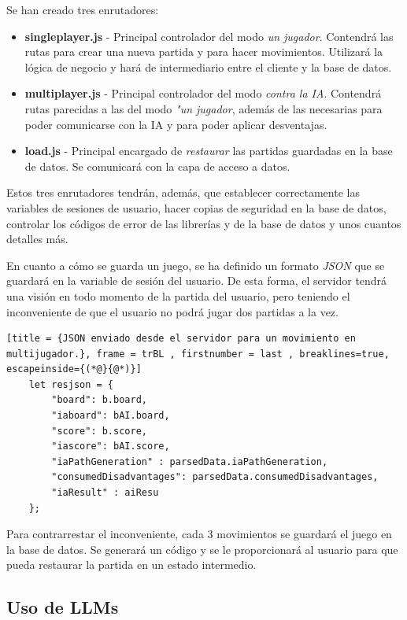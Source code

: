 \documentclass[12pt,epsf,titlepage,a4paper]{article}
\begin{document}
Se han creado tres enrutadores:
\begin{itemize}
    \item \textbf{singleplayer.js} - Principal controlador del modo \emph{un jugador}. Contendrá las rutas para crear una nueva partida y para hacer movimientos. Utilizará la lógica de negocio y hará de intermediario entre el cliente y la base de datos.
    \item \textbf{multiplayer.js} - Principal controlador del modo \emph{contra la IA}. Contendrá rutas parecidas a las del modo \emph{"un jugador}, además de las necesarias para poder comunicarse con la IA y para poder aplicar desventajas.
    \item \textbf{load.js} - Principal encargado de \emph{restaurar} las partidas guardadas en la base de datos. Se comunicará con la capa de acceso a datos.
\end{itemize}

Estos tres enrutadores tendrán, además, que establecer correctamente las variables de sesiones de usuario, hacer copias de seguridad en la base de datos, controlar los códigos de error de las librerías y de la base de datos y unos cuantos detalles más.

En cuanto a cómo se guarda un juego, se ha definido un formato \emph{JSON} que se guardará en la variable de sesión del usuario. De esta forma, el servidor tendrá una visión en todo momento de la partida del usuario, pero teniendo el inconveniente de que el usuario no podrá jugar dos partidas a la vez. 

    \begin{lstlisting}[title = {JSON enviado desde el servidor para un movimiento en multijugador.}, frame = trBL , firstnumber = last , breaklines=true, escapeinside={(*@}{@*)}]
    let resjson = {
        "board": b.board,
        "iaboard": bAI.board,
        "score": b.score,
        "iascore": bAI.score,
        "iaPathGeneration" : parsedData.iaPathGeneration,
        "consumedDisadvantages": parsedData.consumedDisadvantages,
        "iaResult" : aiResu
    };
    \end{lstlisting}

Para contrarrestar el inconveniente, cada 3 movimientos se guardará el juego en la base de datos. Se generará un código y se le proporcionará al usuario para que pueda restaurar la partida en un estado intermedio.

\subsection{Uso de LLMs}
\end{document}
